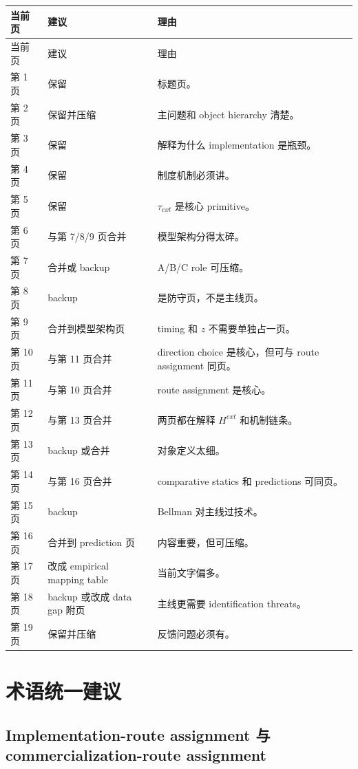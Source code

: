 \documentclass[12pt]{ctexart}
\begin{document}
\begin{center}
\begin{longtable}{L{0.15\textwidth}L{0.25\textwidth}L{0.48\textwidth}}
\toprule
当前页 & 建议 & 理由 \\
\midrule
\endfirsthead
\toprule
当前页 & 建议 & 理由 \\
\midrule
\endhead
第 1 页 & 保留 & 标题页。 \\
第 2 页 & 保留并压缩 & 主问题和 object hierarchy 清楚。 \\
第 3 页 & 保留 & 解释为什么 implementation 是瓶颈。 \\
第 4 页 & 保留 & 制度机制必须讲。 \\
第 5 页 & 保留 & $\tau_{ext}$ 是核心 primitive。 \\
第 6 页 & 与第 7/8/9 页合并 & 模型架构分得太碎。 \\
第 7 页 & 合并或 backup & A/B/C role 可压缩。 \\
第 8 页 & backup & 是防守页，不是主线页。 \\
第 9 页 & 合并到模型架构页 & timing 和 $z$ 不需要单独占一页。 \\
第 10 页 & 与第 11 页合并 & direction choice 是核心，但可与 route assignment 同页。 \\
第 11 页 & 与第 10 页合并 & route assignment 是核心。 \\
第 12 页 & 与第 13 页合并 & 两页都在解释 $H^{ext}$ 和机制链条。 \\
第 13 页 & backup 或合并 & 对象定义太细。 \\
第 14 页 & 与第 16 页合并 & comparative statics 和 predictions 可同页。 \\
第 15 页 & backup & Bellman 对主线过技术。 \\
第 16 页 & 合并到 prediction 页 & 内容重要，但可压缩。 \\
第 17 页 & 改成 empirical mapping table & 当前文字偏多。 \\
第 18 页 & backup 或改成 data gap 附页 & 主线更需要 identification threats。 \\
第 19 页 & 保留并压缩 & 反馈问题必须有。 \\
\bottomrule
\end{longtable}
\end{center}

\section{术语统一建议}

\subsection{Implementation-route assignment 与 commercialization-route assignment}
\end{document}
